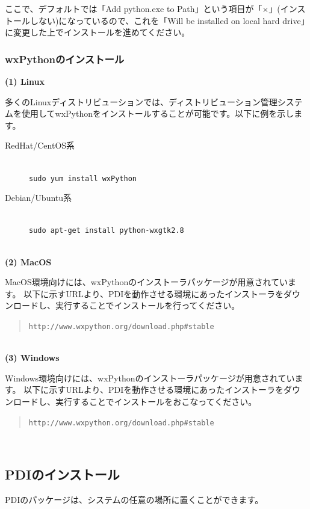 \documentclass[a4paper,11pt]{jarticle}
\begin{document}
ここで、デフォルトでは「Add python.exe to Path」という項目が「×」(インストールしない)になっているので、これを「Will be installed on local hard drive」に変更した上でインストールを進めてください。
{\ }\\


\subsubsection{wxPythonのインストール}

\textbf{(1) Linux}

多くのLinuxディストリビューションでは、ディストリビューション管理システムを使用してwxPythonをインストールすることが可能です。以下に例を示します。

\begin{description}
\item[RedHat/CentOS系] {\ }\\
{\tt sudo yum install wxPython}\\
\item[Debian/Ubuntu系] {\ }\\
{\tt sudo apt-get install python-wxgtk2.8}
\end{description}
{\ }\\


\textbf{(2) MacOS}

MacOS環境向けには、wxPythonのインストーラパッケージが用意されています。
以下に示すURLより、PDIを動作させる環境にあったインストーラをダウンロードし、実行することでインストールを行ってください。
\begin{quote}
{\tt http://www.wxpython.org/download.php\#stable}
\end{quote}
{\ }\\


\textbf{(3) Windows}

Windows環境向けには、wxPythonのインストーラパッケージが用意されています。
以下に示すURLより、PDIを動作させる環境にあったインストーラをダウンロードし、実行することでインストールをおこなってください。
\begin{quote}
{\tt http://www.wxpython.org/download.php\#stable}
\end{quote}
{\ }\\



\subsection{PDIのインストール}

PDIのパッケージは、システムの任意の場所に置くことができます。
\end{document}
